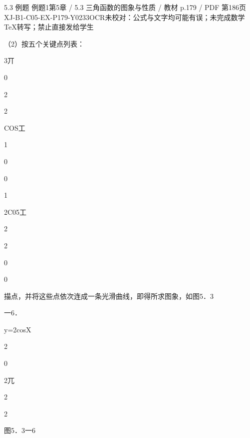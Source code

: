 \begin{bankitem}{5.3 例题 例题1}{第5章 / 5.3 三角函数的图象与性质 / 教材 p.179 / PDF 第186页}{XJ-B1-C05-EX-P179-Y0233}{OCR未校对：公式与文字均可能有误；未完成数学TeX转写；禁止直接发给学生}
\begin{ocrdraft}
（2）按五个关键点列表：
\par
3丌
\par
0
\par
2
\par
2
\par
COS工
\par
1
\par
0
\par
0
\par
1
\par
2C05工
\par
2
\par
2
\par
0
\par
0
\par
描点，并将这些点依次连成一条光滑曲线，即得所求图象，如图5．3
\par
一6．
\par
y=2cosX
\par
2
\par
0
\par
2兀
\par
2
\par
2
\par
图5．3一6
\end{ocrdraft}
\end{bankitem}
